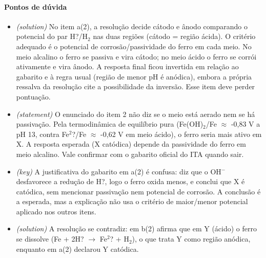 \documentclass{article}%
\begin{document}
\paragraph{Pontos de dúvida}%
\begin{itemize}%
\item%
\textit{(solution)} No item a(2), a resolução decide cátodo e ânodo comparando o potencial do par H?/H$_{2}$ nas duas regiões (cátodo = região ácida). O critério adequado é o potencial de corrosão/passividade do ferro em cada meio. No meio alcalino o ferro se passiva e vira cátodo; no meio ácido o ferro se corrói ativamente e vira ânodo. A resposta final ficou invertida em relação ao gabarito e à regra usual (região de menor pH é anódica), embora a própria ressalva da resolução cite a possibilidade da inversão. Esse item deve perder pontuação.%
\item%
\textit{(statement)} O enunciado do item 2 não diz se o meio está aerado nem se há passivação. Pela termodinâmica de equilíbrio pura (Fe(OH)$_{2}$/Fe $\approx$ -0,83 V a pH 13, contra Fe$^2$?/Fe $\approx$ -0,62 V em meio ácido), o ferro seria mais ativo em X. A resposta esperada (X catódica) depende da passividade do ferro em meio alcalino. Vale confirmar com o gabarito oficial do ITA quando sair.%
\item%
\textit{(key)} A justificativa do gabarito em a(2) é confusa: diz que o OH$^{-}$ desfavorece a redução de H?, logo o ferro oxida menos, e conclui que X é catódica, sem mencionar passivação nem potencial de corrosão. A conclusão é a esperada, mas a explicação não usa o critério de maior/menor potencial aplicado nos outros itens.%
\item%
\textit{(solution)} A resolução se contradiz: em b(2) afirma que em Y (ácido) o ferro se dissolve (Fe + 2H? $\to$ Fe$^2$? + H$_{2}$), o que trata Y como região anódica, enquanto em a(2) declarou Y catódica.%
\end{itemize}%
\end{document}
